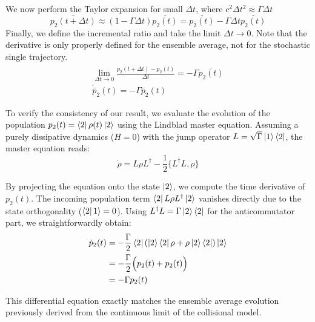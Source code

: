 \documentclass[a4paper,12pt]{article}
\begin{document}
We now perform the Taylor expansion for small $\Delta t$, where $c^2 \Delta t^2 \approx \Gamma \Delta t$
\begin{equation}
	\overline{p_{2} \left( t + \Delta t \right) } \approx \left(1 - \Gamma \Delta t \right) \overline{ p_{2} (t)} =  \overline{ p_{2} (t)} - \Gamma \Delta t  \overline{ p_{2} (t)}
\end{equation}
Finally, we define the incremental ratio and take the limit $\Delta t \to 0$.
Note that the derivative is only properly defined for the ensemble average, not for the stochastic single trajectory.
\begin{gather}
	\lim_{\Delta t \to 0} \frac{\overline{p_{2} \left( t + \Delta t \right) } - \overline{ p_{2} (t)}}{\Delta t} = - \Gamma \overline{ p_{2} (t)} \\
	\dot{\overline{p}}_{2}(t) = -\Gamma \overline{p}_{2}(t)
\end{gather}

To verify the consistency of our result, we evaluate the evolution of the population $ p_{2}(t) = \bra{2} \rho(t) \ket{2} $ using the Lindblad master equation. Assuming a purely dissipative dynamics ($ H = 0 $) with the jump operator $ L = \sqrt{\Gamma} \ket{1}\bra{2} $, the master equation reads:
\begin{equation}
	\dot{\rho} = L \rho L^\dagger - \frac{1}{2} \{L^\dagger L, \rho\}
\end{equation}

By projecting the equation onto the state $ \ket{2} $, we compute the time derivative of $ p_{2}(t) $. The incoming population term $ \bra{2} L \rho L^\dagger \ket{2} $ vanishes directly due to the state orthogonality ($ \bra{2} 1 \rangle = 0 $). Using $ L^\dagger L = \Gamma \ket{2}\bra{2} $ for the anticommutator part, we straightforwardly obtain:
\begin{align}
	\dot{p}_2(t) &= - \frac{\Gamma}{2} \bra{2} \left( \ket{2}\bra{2} \rho + \rho \ket{2}\bra{2} \right) \ket{2} \notag \\
	&= - \frac{\Gamma}{2} \Big( p_{2}(t) + p_{2}(t) \Big) \notag \\
	&= - \Gamma p_{2}(t)
\end{align}

This differential equation exactly matches the ensemble average evolution previously derived from the continuous limit of the collisional model.
\newpage
\end{document}
